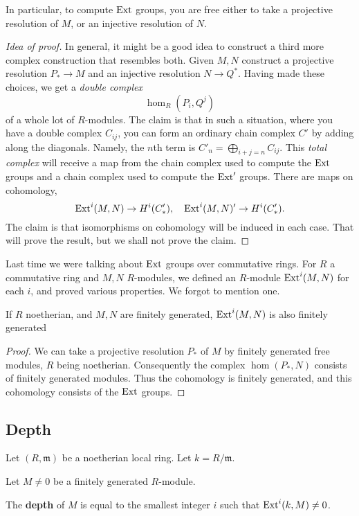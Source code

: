In particular, to compute $\mathrm{Ext}$ groups, you are free either to take a
projective resolution of $M$, or an injective resolution of $N$. 

\begin{proof}[Idea of proof]
In general, it might be a good idea to construct a third more complex
construction that resembles both. Given $M,N$ construct a projective resolution
$P_* \to M$ and an injective resolution $N \to Q^*$. Having made these choices,
we get a \emph{double complex}
\[ \hom_R(P_i, Q^j)  \]
of a whole lot of $R$-modules. The claim is that in such a situation, where
you have a double complex $C_{ij}$, you can
form an ordinary chain complex $C'$
by adding along the diagonals. Namely, the $n$th term 
is $C'_n = \bigoplus_{i+j=n} C_{ij}$. This \emph{total complex} will receive a
map from the chain complex used to compute the $\mathrm{Ext}$ groups and a chain
complex used to compute the $\mathrm{Ext}'$ groups. There are maps on cohomology,
\[ \mathrm{Ext}^i(M,N) \to H^i(C'_*), \quad \mathrm{Ext}^i(M,N)' \to H^i(C'_*).  \]
The claim is that isomorphisms on
cohomology will be induced in each case. That will prove the result, but we
shall not prove the claim.
\end{proof} 

Last time we were talking about $\mathrm{Ext}$ groups over commutative rings. For $R$ a
commutative ring and $M,N$ $R$-modules, we defined an $R$-module $\mathrm{Ext}^i(M,N)$ for
each $i$, and proved various properties. We forgot to mention one.

\begin{proposition} 
If $R$ noetherian, and $M,N$ are finitely generated, $\mathrm{Ext}^i(M,N)$ is also finitely generated
\end{proposition} 
\begin{proof} 
We can take a projective resolution $P_*$ of $M$ by finitely generated free modules, $R$ being
noetherian. Consequently the complex $\hom(P_*, N)$ consists of finitely
generated modules. Thus the cohomology is finitely generated, and this cohomology
consists of the $\mathrm{Ext}$ groups.
\end{proof} 


\subsection{Depth} Let $(R, \mathfrak{m})$ be  a noetherian
local ring. Let $k = R/\mathfrak{m}$. 

Let $M \neq 0$ be a finitely generated $R$-module. 

\newcommand{\depth}{\mathrm{depth}}
\begin{definition} 
The \textbf{depth} of $M$ is equal to the smallest integer $i$ such that
$\mathrm{Ext}^i(k,M) \neq 0$.
\end{definition} 

